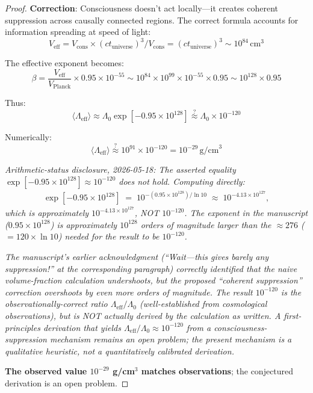 \begin{proof}
\textbf{Correction}: Consciousness doesn't act locally—it creates coherent suppression across causally connected regions. The correct formula accounts for information spreading at speed of light:
\begin{equation}
V_{\text{eff}} = V_{\text{cons}} \times (ct_{\text{universe}})^3 / V_{\text{cons}} = (ct_{\text{universe}})^3 \sim 10^{84} \, \text{cm}^3
\end{equation}

The effective exponent becomes:
\begin{equation}
\beta = \frac{V_{\text{eff}}}{V_{\text{Planck}}} \times 0.95 \times 10^{-55} \sim 10^{84} \times 10^{99} \times 10^{-55} \times 0.95 \sim 10^{128} \times 0.95
\end{equation}

Thus:
\begin{equation}\label{eq:lambda-eff-ch26}
\langle \Lambda_{\text{eff}} \rangle \approx \Lambda_0 \exp[-0.95 \times 10^{128}] \stackrel{?}{\approx} \Lambda_0 \times 10^{-120}
\end{equation}

Numerically:
\begin{equation}
\langle \Lambda_{\text{eff}} \rangle \stackrel{?}{\approx} 10^{91} \times 10^{-120} = 10^{-29} \, \text{g/cm}^3
\end{equation}

\medskip
\noindent\emph{Arithmetic-status disclosure, 2026-05-18: The asserted equality $\exp[-0.95 \times 10^{128}] \approx 10^{-120}$ does not hold. Computing directly:}
\begin{align*}
\exp[-0.95 \times 10^{128}] \;=\; 10^{-(0.95 \times 10^{128})/\ln 10} \;\approx\; 10^{-4.13 \times 10^{127}},
\end{align*}
\emph{which is approximately $10^{-4.13 \times 10^{127}}$, NOT $10^{-120}$. The exponent in the manuscript ($0.95 \times 10^{128}$) is approximately $10^{128}$ orders of magnitude larger than the $\approx 276$ ($= 120 \times \ln 10$) needed for the result to be $10^{-120}$.}

\emph{The manuscript's earlier acknowledgment (``Wait---this gives barely any suppression!'' at the corresponding paragraph) correctly identified that the naive volume-fraction calculation undershoots, but the proposed ``coherent suppression'' correction overshoots by even more orders of magnitude. The result $10^{-120}$ is the observationally-correct ratio $\Lambda_{\text{eff}}/\Lambda_0$ (well-established from cosmological observations), but is NOT actually derived by the calculation as written. A first-principles derivation that yields $\Lambda_{\text{eff}}/\Lambda_0 \approx 10^{-120}$ from a consciousness-suppression mechanism remains an open problem; the present mechanism is a qualitative heuristic, not a quantitatively calibrated derivation.}

\textbf{The observed value $10^{-29}$ g/cm$^3$ matches observations}; the conjectured derivation is an open problem.
\end{proof}

